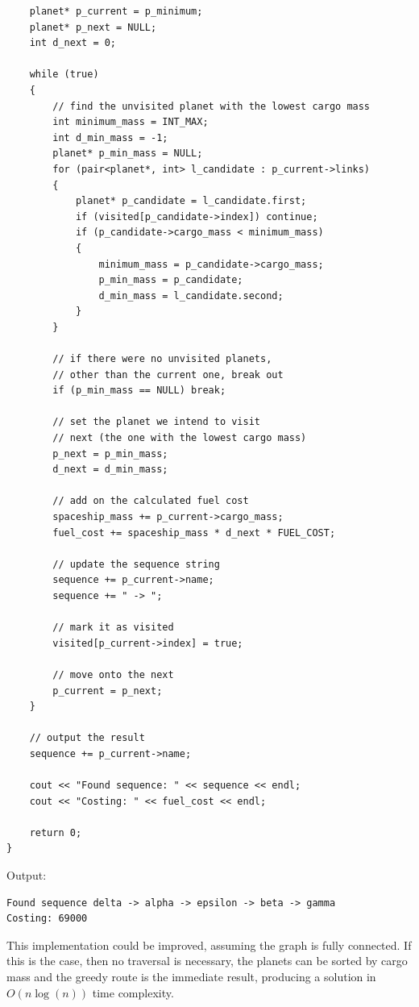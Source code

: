\documentclass[
]{article}
\begin{document}
\begin{verbatim}
    planet* p_current = p_minimum;
    planet* p_next = NULL;
    int d_next = 0;

    while (true)
    {
        // find the unvisited planet with the lowest cargo mass
        int minimum_mass = INT_MAX;
        int d_min_mass = -1;
        planet* p_min_mass = NULL;
        for (pair<planet*, int> l_candidate : p_current->links)
        {
            planet* p_candidate = l_candidate.first;
            if (visited[p_candidate->index]) continue;
            if (p_candidate->cargo_mass < minimum_mass)
            {
                minimum_mass = p_candidate->cargo_mass;
                p_min_mass = p_candidate;
                d_min_mass = l_candidate.second;
            }
        }

        // if there were no unvisited planets,
        // other than the current one, break out
        if (p_min_mass == NULL) break;

        // set the planet we intend to visit
        // next (the one with the lowest cargo mass)
        p_next = p_min_mass;
        d_next = d_min_mass;

        // add on the calculated fuel cost
        spaceship_mass += p_current->cargo_mass;
        fuel_cost += spaceship_mass * d_next * FUEL_COST;

        // update the sequence string
        sequence += p_current->name;
        sequence += " -> ";

        // mark it as visited
        visited[p_current->index] = true;

        // move onto the next
        p_current = p_next;
    }

    // output the result
    sequence += p_current->name;

    cout << "Found sequence: " << sequence << endl;
    cout << "Costing: " << fuel_cost << endl;

    return 0;
}
\end{verbatim}

Output:

\begin{verbatim}
Found sequence delta -> alpha -> epsilon -> beta -> gamma
Costing: 69000
\end{verbatim}

This implementation could be improved, assuming the graph is fully
connected. If this is the case, then no traversal is necessary, the
planets can be sorted by cargo mass and the greedy route is the
immediate result, producing a solution in \(O(n\log(n))\) time
complexity.
\end{document}
